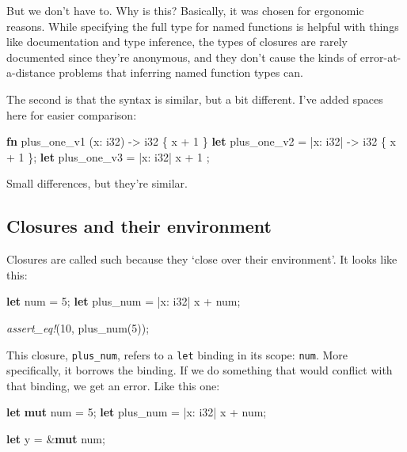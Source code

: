 \documentclass[a4paper,]{book}
\newenvironment{Shaded}{\begin{snugshade}}{\end{snugshade}}
\newcommand{\KeywordTok}[1]{\textcolor[rgb]{0.13,0.29,0.53}{\textbf{{#1}}}}
\newcommand{\DataTypeTok}[1]{\textcolor[rgb]{0.13,0.29,0.53}{{#1}}}
\newcommand{\DecValTok}[1]{\textcolor[rgb]{0.00,0.00,0.81}{{#1}}}
\newcommand{\PreprocessorTok}[1]{\textcolor[rgb]{0.56,0.35,0.01}{\textit{{#1}}}}
\newcommand{\NormalTok}[1]{{#1}}
\begin{document}
But we don't have to. Why is this? Basically, it was chosen for
ergonomic reasons. While specifying the full type for named functions is
helpful with things like documentation and type inference, the types of
closures are rarely documented since they're anonymous, and they don't
cause the kinds of error-at-a-distance problems that inferring named
function types can.

The second is that the syntax is similar, but a bit different. I've
added spaces here for easier comparison:

\begin{Shaded}
\begin{Highlighting}[]
\KeywordTok{fn}  \NormalTok{plus_one_v1   (x: }\DataTypeTok{i32}\NormalTok{) -> }\DataTypeTok{i32} \NormalTok{\{ x + }\DecValTok{1} \NormalTok{\}}
\KeywordTok{let} \NormalTok{plus_one_v2 = |x: }\DataTypeTok{i32}\NormalTok{| -> }\DataTypeTok{i32} \NormalTok{\{ x + }\DecValTok{1} \NormalTok{\};}
\KeywordTok{let} \NormalTok{plus_one_v3 = |x: }\DataTypeTok{i32}\NormalTok{|          x + }\DecValTok{1}  \NormalTok{;}
\end{Highlighting}
\end{Shaded}

Small differences, but they're similar.

\subsection{Closures and their
environment}\label{closures-and-their-environment}

Closures are called such because they `close over their environment'. It
looks like this:

\begin{Shaded}
\begin{Highlighting}[]
\KeywordTok{let} \NormalTok{num = }\DecValTok{5}\NormalTok{;}
\KeywordTok{let} \NormalTok{plus_num = |x: }\DataTypeTok{i32}\NormalTok{| x + num;}

\PreprocessorTok{assert_eq!}\NormalTok{(}\DecValTok{10}\NormalTok{, plus_num(}\DecValTok{5}\NormalTok{));}
\end{Highlighting}
\end{Shaded}

This closure, \texttt{plus\_num}, refers to a \texttt{let} binding in
its scope: \texttt{num}. More specifically, it borrows the binding. If
we do something that would conflict with that binding, we get an error.
Like this one:

\begin{Shaded}
\begin{Highlighting}[]
\KeywordTok{let} \KeywordTok{mut} \NormalTok{num = }\DecValTok{5}\NormalTok{;}
\KeywordTok{let} \NormalTok{plus_num = |x: }\DataTypeTok{i32}\NormalTok{| x + num;}

\KeywordTok{let} \NormalTok{y = &}\KeywordTok{mut} \NormalTok{num;}
\end{Highlighting}
\end{Shaded}
\end{document}
